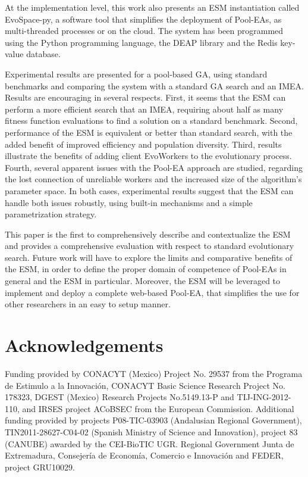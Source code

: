 At the implementation level, this work also presents an ESM instantiation called EvoSpace-py, a software tool that simplifies the deployment of Pool-EAs,
as multi-threaded processes or on the cloud.
The system has been programmed using the Python programming language, the DEAP library and the Redis key-value database.

Experimental results are presented for a pool-based GA, using standard benchmarks and comparing the system with a standard GA search and an IMEA.
Results are encouraging in several respects.
First, it seems that the ESM can perform a more efficient search that an IMEA, requiring about half as many fitness function evaluations to find
a solution on a standard benchmark.
Second, performance of the ESM is equivalent or better than standard search, with the added benefit of improved efficiency
and population diversity.
Third, results illustrate the benefits of adding client EvoWorkers to the evolutionary process.
Fourth, several apparent issues with the Pool-EA approach are studied, regarding the lost connection of unreliable workers and the increased size of the algorithm's parameter space.
In both cases, experimental results suggest that the ESM can handle both issues robustly, using built-in mechanisms and a simple
parametrization strategy.

This paper is the first to comprehensively describe and contextualize the ESM and provides a comprehensive evaluation with respect to standard evolutionary search.
Future work will have to explore the limits and comparative benefits of the ESM,
in order to define the proper domain of competence of Pool-EAs in general and the ESM in particular.
Moreover, the ESM will be leveraged to implement and deploy a complete web-based Pool-EA, that simplifies the use for other researchers in an easy to setup manner.


\section*{Acknowledgements}
Funding provided by CONACYT (Mexico) Project No. 29537 from the Programa de Estimulo a la Innovaci\'on, CONACYT
Basic Science Research Project No. 178323, DGEST (Mexico) Research Projects No.5149.13-P and TIJ-ING-2012-110,
and IRSES project ACoBSEC from the European Commission.
Additional funding provided by projects P08-TIC-03903 (Andalusian Regional Government), TIN2011-28627-C04-02 (Spanish Ministry of Science and Innovation),
project 83 (CANUBE) awarded by the CEI-BioTIC UGR. Regional Government Junta de Extremadura, Consejer\'ia de Econom\'ia, Comercio e Innovaci\'on and FEDER, project GRU10029.


